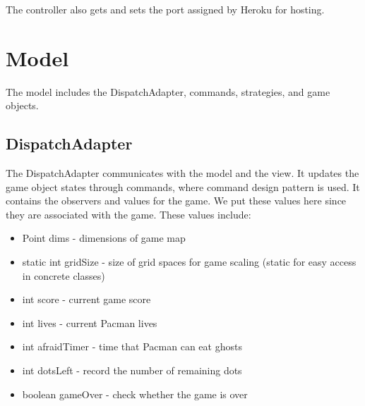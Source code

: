 \documentclass[letterpaper, 11pt]{article}
\begin{document}
The controller also gets and sets the port assigned by Heroku for hosting. 

\section{Model}
The model includes the DispatchAdapter, commands, strategies, and game objects.

\subsection{DispatchAdapter}
The DispatchAdapter communicates with the model and the view. It updates the game object states through commands, where command design pattern is used. It contains the observers and values for the game. We put these values here since they are associated with the game. These values include:
\begin{itemize}
  \item Point dims - dimensions of game map
  \item static int gridSize - size of grid spaces for game scaling (static for easy access in concrete classes)
  \item int score - current game score
  \item int lives - current Pacman lives
  \item int afraidTimer - time that Pacman can eat ghosts 
  \item int dotsLeft - record the number of remaining dots
  \item boolean gameOver - check whether the game is over
\end{itemize}
\end{document}
